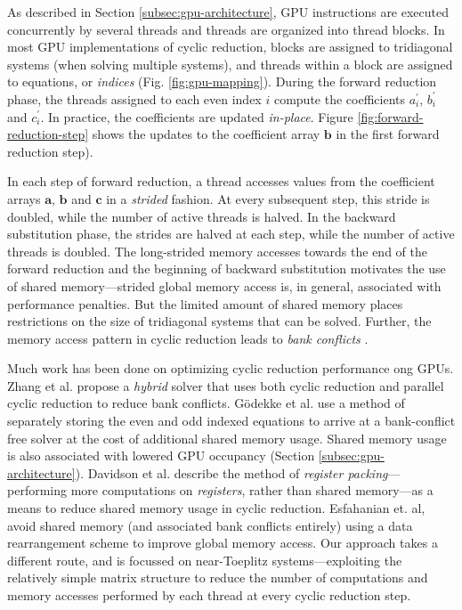 \documentclass{elsarticle}
\begin{document}
As described in Section \ref{subsec:gpu-architecture},
GPU instructions are executed concurrently
by several threads and
threads are organized into thread blocks.
In most GPU implementations of cyclic reduction,
blocks are assigned to tridiagonal systems
(when solving multiple systems),
and threads within a block 
are assigned to equations, or \emph{indices}
(Fig. \ref{fig:gpu-mapping}).
During the forward reduction phase,
the threads assigned to each even index $i$
compute the coefficients
$a_i^\prime$, $b_i^\prime$ and $c_i^\prime$.
In practice, the coefficients are updated \emph{in-place}.
Figure \ref{fig:forward-reduction-step} shows the updates
to the coefficient array $\bm{b}$ in the first forward reduction step).

In each step of forward reduction,
a thread accesses values from the coefficient arrays
$\bm{a}$, $\bm{b}$ and $\bm{c}$ in a \emph{strided} fashion.
At every subsequent step,
this stride is doubled, while the number of active threads is halved.
In the backward substitution phase,
the strides are halved at each step,
while the number of active threads is doubled.
The long-strided memory accesses towards the end
of the forward reduction
and the beginning of backward substitution
motivates the use of shared memory---strided global memory access is,
in general, associated with performance penalties.
But the limited amount of shared memory places restrictions
on the size of tridiagonal systems that can be solved.
Further,
the memory access pattern in
cyclic reduction leads to \emph{bank conflicts}
\cite{Zhang2010FTS}.

Much work has been done on optimizing cyclic reduction performance
ong GPUs.
Zhang et al. \cite{Zhang2010FTS} propose a
\emph{hybrid} solver
that uses both cyclic reduction and parallel cyclic reduction
to reduce bank conflicts.
G{\"o}dekke et al. \cite{GoSt11CR}
use a method of separately storing
the even and odd indexed equations
to arrive at a bank-conflict free solver
at the cost of additional shared memory usage.
Shared memory usage is also associated with
lowered GPU occupancy (Section \ref{subsec:gpu-architecture}).
Davidson et al. \cite{davidson2011register}
describe the method of
\emph{register packing}---performing more computations
on \emph{registers}, rather than shared memory---as
a means to reduce shared memory usage in cyclic reduction.
Esfahanian et. al, \cite{esfahanian2014efficient}
avoid shared memory (and associated bank conflicts entirely)
using a data rearrangement scheme to improve global memory access.
Our approach takes a different route,
and is focussed on near-Toeplitz systems---exploiting
the relatively simple matrix structure
to reduce the number of computations and memory accesses
performed by each thread
at every cyclic reduction step.
\end{document}
